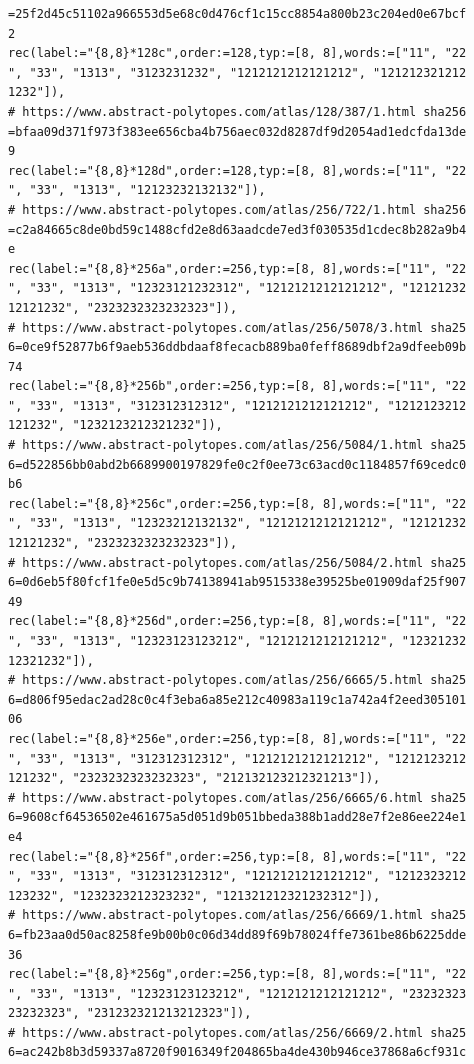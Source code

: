 \documentclass[
  11pt,
  a4paper,
]{article}
\begin{document}
\begin{verbatim}
=25f2d45c51102a966553d5e68c0d476cf1c15cc8854a800b23c204ed0e67bcf
2
rec(label:="{8,8}*128c",order:=128,typ:=[8, 8],words:=["11", "22
", "33", "1313", "3123231232", "1212121212121212", "121212321212
1232"]),
# https://www.abstract-polytopes.com/atlas/128/387/1.html sha256
=bfaa09d371f973f383ee656cba4b756aec032d8287df9d2054ad1edcfda13de
9
rec(label:="{8,8}*128d",order:=128,typ:=[8, 8],words:=["11", "22
", "33", "1313", "12123232132132"]),
# https://www.abstract-polytopes.com/atlas/256/722/1.html sha256
=c2a84665c8de0bd59c1488cfd2e8d63aadcde7ed3f030535d1cdec8b282a9b4
e
rec(label:="{8,8}*256a",order:=256,typ:=[8, 8],words:=["11", "22
", "33", "1313", "12323121232312", "1212121212121212", "12121232
12121232", "2323232323232323"]),
# https://www.abstract-polytopes.com/atlas/256/5078/3.html sha25
6=0ce9f52877b6f9aeb536ddbdaaf8fecacb889ba0feff8689dbf2a9dfeeb09b
74
rec(label:="{8,8}*256b",order:=256,typ:=[8, 8],words:=["11", "22
", "33", "1313", "312312312312", "1212121212121212", "1212123212
121232", "1232123212321232"]),
# https://www.abstract-polytopes.com/atlas/256/5084/1.html sha25
6=d522856bb0abd2b6689900197829fe0c2f0ee73c63acd0c1184857f69cedc0
b6
rec(label:="{8,8}*256c",order:=256,typ:=[8, 8],words:=["11", "22
", "33", "1313", "12323212132132", "1212121212121212", "12121232
12121232", "2323232323232323"]),
# https://www.abstract-polytopes.com/atlas/256/5084/2.html sha25
6=0d6eb5f80fcf1fe0e5d5c9b74138941ab9515338e39525be01909daf25f907
49
rec(label:="{8,8}*256d",order:=256,typ:=[8, 8],words:=["11", "22
", "33", "1313", "12323123123212", "1212121212121212", "12321232
12321232"]),
# https://www.abstract-polytopes.com/atlas/256/6665/5.html sha25
6=d806f95edac2ad28c0c4f3eba6a85e212c40983a119c1a742a4f2eed305101
06
rec(label:="{8,8}*256e",order:=256,typ:=[8, 8],words:=["11", "22
", "33", "1313", "312312312312", "1212121212121212", "1212123212
121232", "2323232323232323", "212132123212321213"]),
# https://www.abstract-polytopes.com/atlas/256/6665/6.html sha25
6=9608cf64536502e461675a5d051d9b051bbeda388b1add28e7f2e86ee224e1
e4
rec(label:="{8,8}*256f",order:=256,typ:=[8, 8],words:=["11", "22
", "33", "1313", "312312312312", "1212121212121212", "1212323212
123232", "1232323212323232", "121321212321232312"]),
# https://www.abstract-polytopes.com/atlas/256/6669/1.html sha25
6=fb23aa0d50ac8258fe9b00b0c06d34dd89f69b78024ffe7361be86b6225dde
36
rec(label:="{8,8}*256g",order:=256,typ:=[8, 8],words:=["11", "22
", "33", "1313", "12323123123212", "1212121212121212", "23232323
23232323", "231232321213212323"]),
# https://www.abstract-polytopes.com/atlas/256/6669/2.html sha25
6=ac242b8b3d59337a8720f9016349f204865ba4de430b946ce37868a6cf931c

\end{verbatim}
\end{document}
